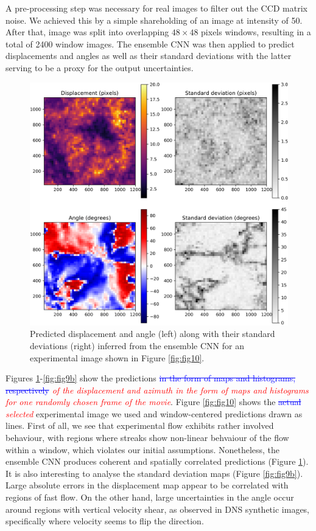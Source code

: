 \documentclass{svjour3}                     %
\newcommand{\new}[1]{\textit{\textcolor{red}{#1}}}
\newcommand{\old}[1]{\textcolor{blue}{\sout{#1}}}
\begin{document}
A pre-processing step was necessary for real images to filter out the CCD matrix noise. We achieved this by a simple shareholding of an image at intensity of 50. After that, image was split into overlapping $48\times 48$ pixels windows, resulting in a total of 2400 window images. The ensemble CNN was then applied to predict displacements and angles as well as their standard deviations with the latter serving to be a proxy for the output uncertainties. 

\begin{figure}
\includegraphics[width=\textwidth]{figs/figure8a.png}
\caption{Predicted displacement and angle (left) along with their standard deviations (right) inferred from the ensemble CNN for an experimental image shown in Figure \ref{fig:fig10}.}
\label{fig:fig9a}
\end{figure}

Figures \ref{fig:fig9a}-\ref{fig:fig9b} show the predictions \old{in the form of maps and histograms, respectively}\new{ of the displacement and azimuth in the form of maps and histograms for one randomly chosen frame of the movie}. Figure \ref{fig:fig10} shows the \old{actual} \new{selected} experimental image we used and window-centered predictions drawn as lines. First of all, we see that experimental flow exhibits rather involved behaviour, with regions where streaks show non-linear behvaiour of the flow within a window, which violates our initial assumptions. Nonetheless, the ensemble CNN produces coherent and spatially correlated predictions (Figure \ref{fig:fig9a}). It is also interesting to analyse the standard deviation maps (Figure \ref{fig:fig9b}). Large absolute errors in the displacement map appear to be correlated with regions of fast flow. On the other hand, large uncertainties in the angle occur around regions with vertical velocity shear, as observed in DNS synthetic images, specifically where velocity seems to flip the direction.
\end{document}
